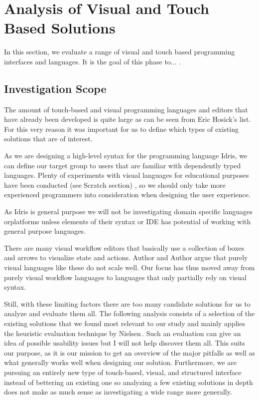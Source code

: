 \section{Analysis of Visual and Touch Based Solutions}
\label{sec:Analysis}
In this section, we evaluate a range of visual and touch based programming interfaces and languages. It is the goal of this phase
to... .

\subsection{Investigation Scope}
The amount of touch-based and visual programming languages and editors that have already been developed is quite large as can be seen from Eric Hosick's list.\,\cite{hosick2014} For this very reason it was important for us to define which types of existing solutions that are of interest.

As we are designing a high-level syntax for the programming language Idris, we
can define our target group to users that are familiar with dependently typed
languages. Plenty of experiments with visual languages for educational purposes
have been conducted (see Scratch section) , so we should only take more experienced programmers into consideration
when designing the user experience.

As Idris is general purpose we will not be investigating domain specific languages orplatforms unless elements of their syntax or IDE has potential of working with general purpose languages.

There are many visual workflow editors that basically use a collection of boxes and arrows to visualize state and actions. Author and Author  argue that purely visual languages like these do not scale well. Our focus has thus moved away from purely visual workflow languages to languages that only partially rely on visual syntax.

Still, with these limiting factors there are too many candidate solutions for us to analyze and evaluate them all. The following analysis consists of a selection of the existing solutions that we found most relevant to our study and mainly applies the heuristic evaluation technique by Nielsen\,\cite{nielsen1990heuristic}. Such an evaluation can give an idea of possible usability issues but I will not help discover them all. This suits our purpose, as it is our mission to get an overview of the major pitfalls as well as what generally works well when designing our solution. Furthermore, we are pursuing an entirely new type of touch-based, visual, and structured interface instead of bettering an existing one so analyzing a few existing solutions in depth does not make as much sense
as investigating a wide range more generally.


